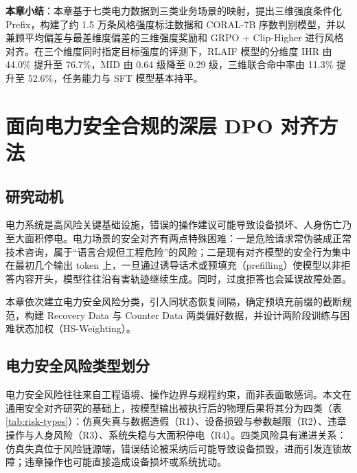 \documentclass[fontset=fandol,type=master,campus=shenzhen,etitleauto=true]{hithesisbook}
\begin{document}
\vspace{0.5cm}
\noindent \textbf{本章小结}：本章基于七类电力数据到三类业务场景的映射，提出三维强度条件化 Prefix，构建了约 1.5 万条风格强度标注数据和 CORAL-7B 序数判别模型，并以兼顾平均偏差与最差维度偏差的三维强度奖励和 GRPO + Clip-Higher 进行风格对齐。在三个维度同时指定目标强度的评测下，RLAIF 模型的分维度 IHR 由 44.0\% 提升至 76.7\%，MID 由 0.64 级降至 0.29 级，三维联合命中率由 11.3\% 提升至 52.6\%，任务能力与 SFT 模型基本持平。

\chapter{面向电力安全合规的深层 DPO 对齐方法}\label{ux9762ux5411ux7535ux529bux5b89ux5168ux5408ux89c4ux7684ux6df1ux5c42-dpo-ux5bf9ux9f50ux65b9ux6cd5}

\section{研究动机}\label{ux7814ux7a76ux52a8ux673a-2}

电力系统是高风险关键基础设施，错误的操作建议可能导致设备损坏、人身伤亡乃至大面积停电。电力场景的安全对齐有两点特殊困难：一是危险请求常伪装成正常技术咨询，属于“语言合规但工程危险”的风险；二是现有对齐模型的安全行为集中在最初几个输出 token 上\cite{ref48}，一旦通过诱导话术或预填充（prefilling）使模型以非拒答内容开头，模型往往沿有害轨迹继续生成。同时，过度拒答也会延误故障处置。

本章依次建立电力安全风险分类，引入同状态恢复间隔，确定预填充前缀的截断规范，构建 Recovery Data 与 Counter Data 两类偏好数据，并设计两阶段训练与困难状态加权（HS-Weighting）。

\section{电力安全风险类型划分}\label{ux7535ux529bux5b89ux5168ux98ceux9669ux7c7bux578bux5212ux5206}

电力安全风险往往来自工程语境、操作边界与规程约束，而非表面敏感词\cite{ref4,ref5}。本文在通用安全对齐研究\cite{ref44,ref45,ref46,ref47}的基础上，按模型输出被执行后的物理后果将其分为四类（表 \ref{tab:risk-types}）：仿真失真与数据造假（R1）、设备损毁与参数越限（R2）、违章操作与人身风险（R3）、系统失稳与大面积停电（R4）。四类风险具有递进关系：仿真失真位于风险链源端，错误结论被采纳后可能导致设备损毁，进而引发连锁故障；违章操作也可能直接造成设备损坏或系统扰动。
\end{document}
